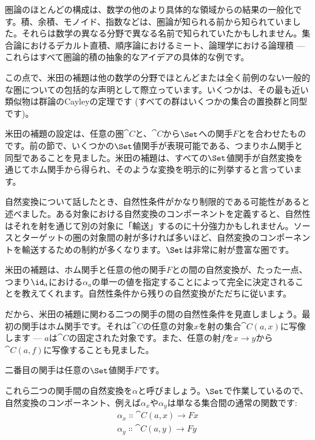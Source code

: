 
\lettrine[lhang=0.17]{圏}{論}のほとんどの構成は、数学の他のより具体的な領域からの結果の一般化です。積、余積、モノイド、指数などは、圏論が知られる前から知られていました。それらは数学の異なる分野で異なる名前で知られていたかもしれません。集合論におけるデカルト直積、順序論におけるミート、論理学における論理積 — これらはすべて圏論的積の抽象的なアイデアの具体的な例です。

この点で、米田の補題は他の数学の分野でほとんどまたは全く前例のない一般的な圏についての包括的な声明として際立っています。いくつかは、その最も近い類似物は群論のCayleyの定理です (すべての群はいくつかの集合の置換群と同型です)。

米田の補題の設定は、任意の圏$\cat{C}$と、$\cat{C}$から$\Set$への関手$F$とを合わせたものです。前の節で、いくつかの$\Set$値関手が表現可能である、つまりホム関手と同型であることを見ました。米田の補題は、すべての$\Set$値関手が自然変換を通じてホム関手から得られ、そのような変換を明示的に列挙すると言っています。

自然変換について話したとき、自然性条件がかなり制限的である可能性があると述べました。ある対象における自然変換のコンポーネントを定義すると、自然性はそれを射を通じて別の対象に「輸送」するのに十分強力かもしれません。ソースとターゲットの圏の対象間の射が多ければ多いほど、自然変換のコンポーネントを輸送するための制約が多くなります。$\Set$は非常に射が豊富な圏です。

米田の補題は、ホム関手と任意の他の関手$F$との間の自然変換が、たった一点、つまり$\id_a$における$\alpha_a$の単一の値を指定することによって完全に決定されることを教えてくれます。自然性条件から残りの自然変換がただちに従います。

だから、米田の補題に関わる二つの関手の間の自然性条件を見直しましょう。最初の関手はホム関手です。それは$\cat{C}$の任意の対象$x$を射の集合$\cat{C}(a, x)$に写像します — $a$は$\cat{C}$の固定された対象です。また、任意の射$f$を$x \to y$から$\cat{C}(a, f)$に写像することも見ました。

二番目の関手は任意の$\Set$値関手$F$です。

これら二つの関手間の自然変換を$\alpha$と呼びましょう。$\Set$で作業しているので、自然変換のコンポーネント、例えば$\alpha_x$や$\alpha_y$は単なる集合間の通常の関数です: 
\begin{gather*}
  \alpha_x \Colon \cat{C}(a, x) \to F x \\
  \alpha_y \Colon \cat{C}(a, y) \to F y
\end{gather*}

